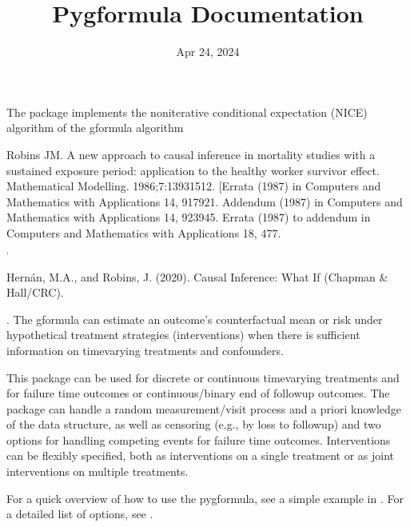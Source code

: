 \documentclass[letterpaper,10pt,english]{sphinxmanual}
\title{Pygformula Documentation}
\date{Apr 24, 2024}
\author{}
\begin{document}
\pagestyle{empty}
\sphinxmaketitle
\pagestyle{plain}
\sphinxtableofcontents
\pagestyle{normal}
\label{\detokenize{index::doc}}


\sphinxAtStartPar
The  package implements the non\sphinxhyphen{}iterative
conditional expectation (NICE) algorithm of the g\sphinxhyphen{}formula algorithm \sphinxstepexplicit %
\begin{footnote}[1]\label{\thesphinxscope.1}%
\sphinxAtStartFootnote
Robins JM. A new approach to causal inference in mortality studies with a sustained exposure period:
application to the healthy worker survivor effect. Mathematical Modelling. 1986;7:1393\textendash{}1512. {[}Errata (1987)
in Computers and Mathematics with Applications 14, 917\sphinxhyphen{}921. Addendum (1987) in Computers and Mathematics
with Applications 14, 923\sphinxhyphen{}945. Errata (1987) to addendum in Computers and Mathematics with Applications
18, 477.
%
\end{footnote} $^{\text{,}}$ \sphinxstepexplicit %
\begin{footnote}[2]\label{\thesphinxscope.2}%
\sphinxAtStartFootnote
Hernán, M.A., and Robins, J. (2020). Causal Inference: What If (Chapman \& Hall/CRC).
%
\end{footnote}. The g\sphinxhyphen{}formula can estimate an
outcome’s counterfactual mean or risk under hypothetical treatment strategies (interventions) when there
is sufficient information on time\sphinxhyphen{}varying treatments and confounders.

\sphinxAtStartPar
This package can be used for discrete or continuous time\sphinxhyphen{}varying treatments and for failure time outcomes or
continuous/binary end of follow\sphinxhyphen{}up outcomes. The package can handle a random measurement/visit process and a
priori knowledge of the data structure, as well as censoring (e.g., by loss to follow\sphinxhyphen{}up) and two options for
handling competing events for failure time outcomes. Interventions can be flexibly specified, both as
interventions on a single treatment or as joint interventions on multiple treatments.

\sphinxAtStartPar
For a quick overview of how to use the pygformula, see a simple example in {\hyperref[\detokenize{Get Started::doc}]{}}.
For a detailed list of options, see {\hyperref[\detokenize{Specifications/index::doc}]{}}.
\end{document}
